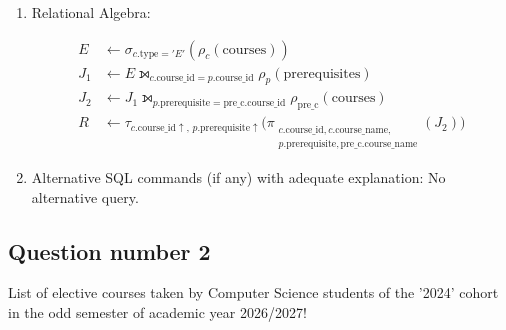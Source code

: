 \begin{enumerate}
    \item Relational Algebra:

    \begin{align*}
    E &\leftarrow
    \sigma_{c.\text{type}='E'}
    (\rho_c(\text{courses})) \\[4pt]
    J_1 &\leftarrow
    E \leftouterjoin_{
        c.\text{course\_id}=p.\text{course\_id}
    }
    \rho_p(\text{prerequisites}) \\[4pt]
    J_2 &\leftarrow
    J_1 \leftouterjoin_{
        p.\text{prerequisite}=\text{pre\_c.course\_id}
    }
    \rho_{\text{pre\_c}}(\text{courses}) \\[4pt]
    R &\leftarrow
    \tau_{c.\text{course\_id}\uparrow,\,
           p.\text{prerequisite}\uparrow}
    \Big(
    \pi_{\substack{
        c.\text{course\_id},
        c.\text{course\_name},\\
        p.\text{prerequisite},
        \text{pre\_c.course\_name}
    }}(J_2)
    \Big)
    \end{align*}

    \item Alternative SQL commands (if any) with adequate explanation: No alternative query.
\end{enumerate}

\subsection{Question number 2}

\begin{tcolorbox}
List of elective courses taken by Computer Science students of the '2024' cohort in the odd semester of academic year 2026/2027!
\end{tcolorbox}

